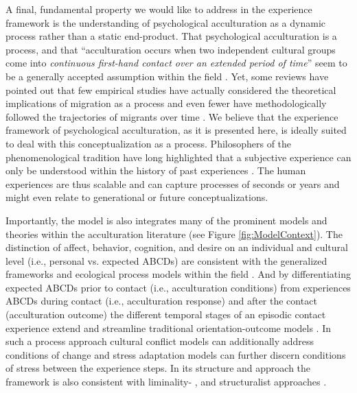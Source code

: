 \documentclass[man, 12pt, a4paper, mask]{apa7}
\begin{document}
A final, fundamental property we would like to address in the experience framework is the understanding of psychological acculturation as a dynamic process rather than a static end-product. That psychological acculturation is a process, and that ``acculturation occurs when two independent cultural groups come into \textit{continuous first-hand contact over an extended period of time}'' \citep[][186]{Berry1989} seem to be a generally accepted assumption within the field \citep[e.g.,][]{Ward2016}. Yet, some reviews have pointed out that few empirical studies have actually considered the theoretical implications of migration as a process and even fewer have methodologically followed the trajectories of migrants over time \citep[][]{Brown2011, Ward2019}. We believe that the experience framework of psychological acculturation, as it is presented here, is ideally suited to deal with this conceptualization as a process. Philosophers of the phenomenological tradition have long highlighted that a subjective experience can only be understood within the history of past experiences \citep[e.g.,][]{Heidegger1867}. The human experiences are thus scalable and can capture processes of seconds or years and might even relate to generational or future conceptualizations.

Importantly, the model is also integrates many of the prominent models and theories within the acculturation literature (see Figure \ref{fig:ModelContext}). The distinction of affect, behavior, cognition, and desire on an individual and cultural level (i.e., personal vs. expected ABCDs) are consistent with the generalized frameworks \citep[e.g.,][]{Berry2005, Cross1991} and ecological process models within the field \citep[e.g.,][]{Ward2016, Serdarevic2005, Mistry2010}. And by differentiating expected ABCDs prior to contact (i.e., acculturation conditions) from experiences ABCDs during contact (i.e., acculturation response) and after the contact (acculturation outcome) the different temporal stages of an episodic contact experience extend and streamline traditional orientation-outcome models \citep[e.g.,][]{Arends-Toth2006a, TeLindert2008a}. In such a process approach cultural conflict models can additionally address conditions of change \citep[e.g.,][]{Robinson2019} and stress adaptation models can further discern conditions of stress \citep[e.g.,][]{Kim1988, Hajro2019, Sam2006b} between the experience steps. In its structure and approach the framework is also consistent with liminality- \citep[e.g.,][]{Loon2021, Baird2015}, and structuralist approaches \citep[e.g.,][]{Kemppainen2020}.
\end{document}
